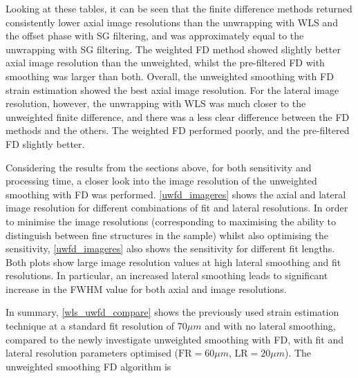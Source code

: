 Looking at these tables, it can be seen that the finite difference methods returned consistently lower axial image resolutions than the unwrapping with WLS and the offset phase with SG filtering, and was approximately equal to the unwrapping with SG filtering. The weighted FD method showed slightly better axial image resolution than the unweighted, whilst the pre-filtered FD with smoothing was larger than both. Overall, the unweighted smoothing with FD strain estimation showed the best axial image resolution. 
For the lateral image resolution, however, the unwrapping with WLS was much closer to the unweighted finite difference, and there was a less clear difference between the FD methods and the others. The weighted FD performed poorly, and the pre-filtered FD slightly better. 

Considering the results from the sections above, for both sensitivity and processing time, a closer look into the image resolution of the unweighted smoothing with FD was performed. \autoref{uwfd_imageres} shows the axial and lateral image resolution for different combinations of fit and lateral resolutions. In order to minimise the image resolutions (corresponding to maximising the ability to distinguish between fine structures in the sample) whilst also optimising the sensitivity, \autoref{uwfd_imageres} also shows the sensitivity for different fit lengths. Both plots show large image resolution values at high lateral smoothing and fit resolutions. In particular, an increased lateral smoothing leads to significant increase in the FWHM value for both axial and image resolutions. 

In summary, \autoref{wls_uwfd_compare} shows the previously used strain estimation technique at a standard fit resolution of $70\mu m$ and with no lateral smoothing, compared to the newly investigate unweighted smoothing with FD, with fit and lateral resolution parameters optimised ($\text{FR}=60\mu m$, $\text{LR}= 20\mu m$). The unweighted smoothing FD algorithm is  

